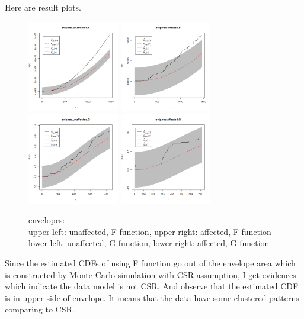 \documentclass{article}
\begin{document}
Here are result plots.
\begin{figure}[!h]
    \centering
    \includegraphics[width=4cm]{prob1_rectangular_window_unaffected_evlp_F.png}
    \includegraphics[width=4cm]{prob1_rectangular_window_affected_evlp_F.png} \\ 
    \includegraphics[width=4cm]{prob1_rectangular_window_unaffected_evlp_G.png}
    \includegraphics[width=4cm]{prob1_rectangular_window_affected_evlp_G.png}
    \caption{envelopes: \\
    upper-left: unaffected, F function, upper-right: affected, F function\\
    lower-left: unaffected, G function, lower-right: affected, G function}
\end{figure}

\clearpage
Since the estimated CDFs of using F function go out of the envelope area 
which is constructed by Monte-Carlo simulation with CSR assumption,
I get evidences which indicate the data model is not CSR.
And observe that the estimated CDF is in upper side of envelope.
It means that the data have some clustered patterns comparing to CSR.
\end{document}
